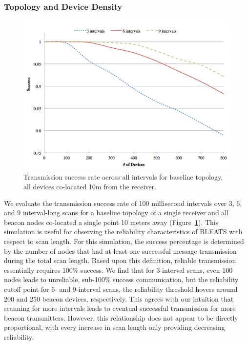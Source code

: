 \subsubsection{Topology and Device Density}

\begin{figure} \centering
\includegraphics[width=\columnwidth]{figures/base-topo-error.png}
\caption{Transmission success rate across all intervals for baseline topology, all devices co-located 10m from the receiver.}
\label{fig:base-topo-error} \end{figure}

We evaluate the transmission success rate of 100 millisecond intervals over 3,
6, and 9 interval-long scans for a baseline topology of a single receiver and
all beacon nodes co-located a single point 10 meters away
(Figure~\ref{fig:base-topo-error}). This simulation is useful for observing
the reliability characteristics of BLEATS with respect to scan length. For this
simulation, the success percentage is determined by the number of nodes that
had at least one successful message transmission during the total scan length.
Based upon this definition, reliable transmission essentially requires 100\%
success. We find that for 3-interval scans, even 100 nodes leads to unreliable,
sub-100\% success communication, but the reliability cutoff point for 6- and
9-interval scans, the reliability threshold hovers around 200 and 250 beacon
devices, respectively. This agrees with our intuition that scanning for more
intervals leads to eventual successful transmission for more beacon
transmitters.  However, this relationship does not appear to be directly
proportional, with every increase in scan length only providing decreasing
reliability. 

